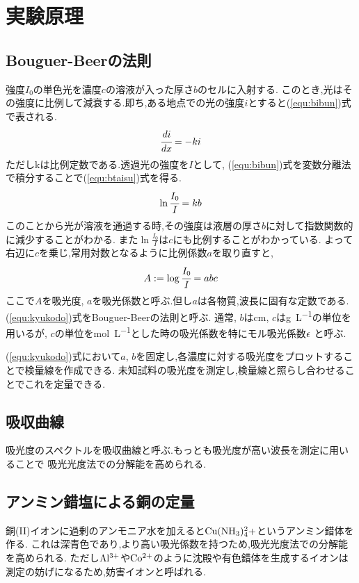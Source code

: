\section{実験原理}
\subsection{Bouguer-Beerの法則}
強度$I_0$の単色光を濃度$c$の溶液が入った厚さ$b$のセルに入射する.
このとき,光はその強度に比例して減衰する.即ち,ある地点での光の強度$i$とすると(\ref{equ:bibun})式で表される.\cite{rikougaku}
\begin{align}
  \label{equ:bibun}
  \cfrac{di}{dx}=-ki
\end{align}
ただしkは比例定数である.透過光の強度を$I$として, (\ref{equ:bibun})式を変数分離法で積分することで(\ref{equ:btaisu})式を得る.
\begin{align}
  \label{equ:btaisu}
  \ln \cfrac{I_0}{I}=kb
\end{align}
このことから光が溶液を通過する時,その強度は液層の厚さ$b$に対して指数関数的に減少することがわかる.
また$\ln\tfrac{I_0}{I}$は$c$にも比例することがわかっている.
よって右辺に$c$を乗じ,常用対数となるように比例係数$a$を取り直すと,
\begin{align}
  \label{equ:kyukodo}
  A:=\log \cfrac{I_0}{I}=abc
\end{align}
ここで$A$を吸光度, $a$を吸光係数と呼ぶ.但し$a$は各物質,波長に固有な定数である. (\ref{equ:kyukodo})式をBouguer-Beerの法則と呼ぶ.
通常, $b$は\si{\centi\meter}, $c$は\si{\gram.L^{-1}}の単位を用いるが, $c$の単位を\si{\mole.L^{-1}}とした時の吸光係数を特にモル吸光係数$\rm \epsilon$
と呼ぶ.

(\ref{equ:kyukodo})式において$a$, $b$を固定し,各濃度に対する吸光度をプロットすることで検量線を作成できる.
未知試料の吸光度を測定し,検量線と照らし合わせることでこれを定量できる.
\subsection{吸収曲線}
吸光度のスペクトルを吸収曲線と呼ぶ.もっとも吸光度が高い波長を測定に用いることで
吸光光度法での分解能を高められる.
\subsection{アンミン錯塩による銅の定量}
銅(II)イオンに過剰のアンモニア水を加えると$\rm Cu(NH_3)_4^2+$というアンミン錯体を作る.
これは深青色であり,より高い吸光係数を持つため,吸光光度法での分解能を高められる.
ただし$\rm Al^{3+}$や$\rm Co^{2+}$のように沈殿や有色錯体を生成するイオンは測定の妨げになるため,妨害イオンと呼ばれる.